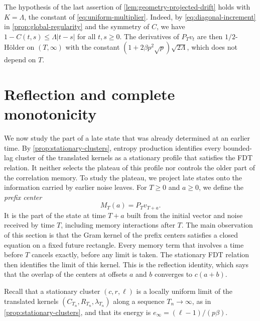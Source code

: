 \begin{remark}\label{rem:geometry-diagonal-increment}
The hypothesis of the last assertion of \cref{lem:geometry-projected-drift} holds with $K=\Lambda$, the constant of \eqref{eq:uniform-multiplier}. Indeed, by \eqref{eq:diagonal-increment} in \cref{prop:global-regularity} and the symmetry of $C$, we have $1-C(t,s)\le\Lambda|t-s|$ for all $t,s\ge0$. The derivatives of $P_Tv_t$ are then $1/2$-H\"older on $(T,\infty)$ with the constant $(1+2\beta p^2\sqrt p)\sqrt{2\Lambda}$, which does not depend on $T$.
\end{remark}

\section{Reflection and complete monotonicity}
\label{sec:selection}

We now study the part of a late state that was already determined at an earlier time. By \cref{prop:stationary-clusters}, entropy production identifies every bounded-lag cluster of the translated kernels as a stationary profile that satisfies the FDT relation. It neither selects the plateau of this profile nor controls the older part of the correlation memory. To study the plateau, we project late states onto the information carried by earlier noise leaves. For $T\ge0$ and $a\ge0$, we define the \emph{prefix center}
\[
 M_T(a)=P_Tv_{T+a}.
\]
It is the part of the state at time $T+a$ built from the initial vector and noise received by time $T$, including memory interactions after $T$. The main observation of this section is that the Gram kernel of the prefix centers satisfies a closed equation on a fixed future rectangle. Every memory term that involves a time before $T$ cancels exactly, before any limit is taken. The stationary FDT relation then identifies the limit of this kernel. This is the reflection identity, which says that the overlap of the centers at offsets $a$ and $b$ converges to $c(a+b)$.

Recall that a stationary cluster $(c,r,\ell)$ is a locally uniform limit of the translated kernels $(C_{T_n},R_{T_n},\lambda_{T_n})$ along a sequence $T_n\to\infty$, as in \cref{prop:stationary-clusters}, and that its energy is $e_\infty=(\ell-1)/(p\beta)$.

